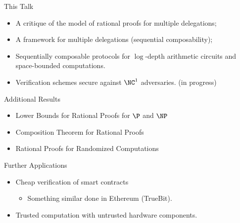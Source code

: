 \begin{frame}{This Talk}
	\begin{itemize}[<+- | alert@+>]	
	\item A critique of the model of rational proofs for multiple delegations;
	\item A framework for multiple delegations (sequential composability);
	\item Sequentially composable protocols for $\log$-depth arithmetic circuits and space-bounded computations.
	\item Verification schemes secure against $\NC^1$ adversaries. (in progress)
	\end{itemize}
\end{frame}

\begin{frame}{Additional Results}
\begin{itemize}[<+- | alert@+>]
	\item Lower Bounds for Rational Proofs for $\P$ and $\NP$
	\item Composition Theorem for Rational Proofs
	\item Rational Proofs for Randomized Computations
\end{itemize}
\end{frame}

\begin{frame}{Further Applications}
	\begin{itemize}[<+- | alert@+>]
		\item 	Cheap verification of smart contracts
		\begin{itemize}
			\item Something similar done in Ethereum (TrueBit).
		\end{itemize}
		\item Trusted computation with untrusted hardware components.
	\end{itemize}

\end{frame}


